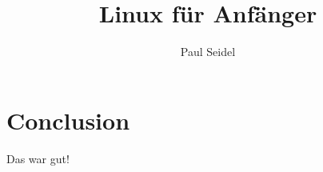 \documentclass{article}
\title{Linux für Anfänger}
\author{Paul Seidel}
\begin{document}
    \maketitle

    \tableofcontents

    

    \section{Conclusion}

    Das war gut!

    
    
\end{document}
